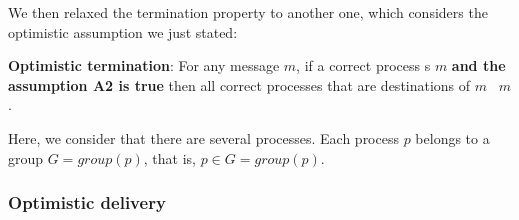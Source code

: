 \documentclass[times, 10pt]{article}
\begin{document}
We then relaxed the termination property to another one, which considers the optimistic assumption we just stated:

\textbf{Optimistic termination}: For any message $m$, if a correct process \cms{}s $m$ \textbf{and the assumption A2 is true} then all correct processes that are destinations of $m$ \cons\ $m$.

Here, we consider that there are several processes. Each process $p$ belongs to a group $G = group(p)$, that is, $p \in G = group(p)$. 

\subsubsection{Optimistic delivery}



\end{document}
